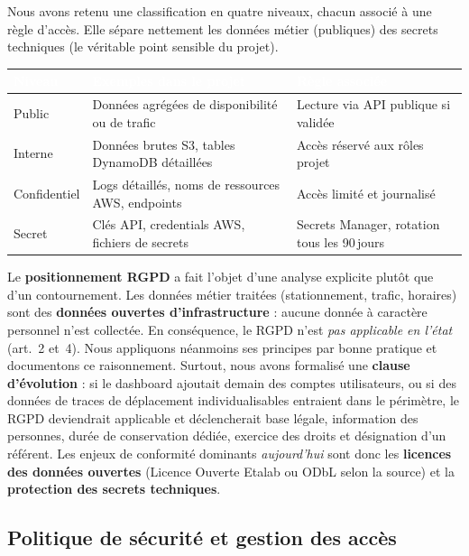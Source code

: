 \documentclass[11pt]{article}
\newcommand{\thead}[1]{\textbf{\textcolor{white}{#1}}}
\begin{document}
Nous avons retenu une classification en quatre niveaux, chacun associé à une règle
d'accès. Elle sépare nettement les données métier (publiques) des secrets techniques
(le véritable point sensible du projet).

\begin{center}
\begin{tabularx}{\linewidth}{@{}>{\raggedright\arraybackslash}p{2.3cm}>{\raggedright\arraybackslash}X>{\raggedright\arraybackslash}p{4.4cm}@{}}
\toprule
\rowcolor{tableHeader}
\thead{Niveau} & \thead{Exemples dans le projet} & \thead{Règle associée} \\
\midrule
Public & Données agrégées de disponibilité ou de trafic & Lecture via API publique si validée \\
Interne & Données brutes S3, tables DynamoDB détaillées & Accès réservé aux rôles projet \\
Confidentiel & Logs détaillés, noms de ressources AWS, endpoints & Accès limité et journalisé \\
Secret & Clés API, credentials AWS, fichiers de secrets & Secrets Manager, rotation tous les 90\,jours \\
\bottomrule
\end{tabularx}
\end{center}

Le \textbf{positionnement RGPD} a fait l'objet d'une analyse explicite plutôt que
d'un contournement. Les données métier traitées (stationnement, trafic, horaires)
sont des \textbf{données ouvertes d'infrastructure} : aucune donnée à caractère
personnel n'est collectée. En conséquence, le RGPD n'est \emph{pas applicable en
l'état} (art.~2 et~4). Nous appliquons néanmoins ses principes par bonne pratique et documentons ce raisonnement. Surtout, nous
avons formalisé une \textbf{clause d'évolution} : si le dashboard ajoutait demain des
comptes utilisateurs, ou si des données de traces de déplacement individualisables
entraient dans le périmètre, le RGPD deviendrait applicable et déclencherait base
légale, information des personnes, durée de conservation dédiée, exercice des droits
et désignation d'un référent. Les enjeux de conformité dominants \emph{aujourd'hui}
sont donc les \textbf{licences des données ouvertes} (Licence Ouverte Etalab ou ODbL
selon la source) et la \textbf{protection des secrets techniques}.

\subsection{Politique de sécurité et gestion des accès}
\end{document}
